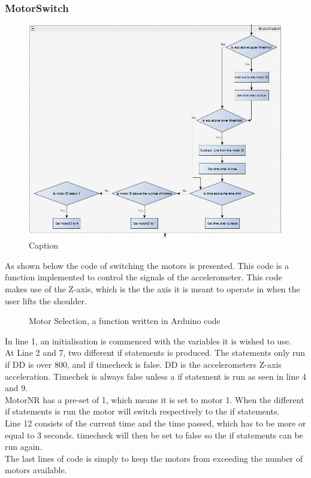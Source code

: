 \subsubsection{ MotorSwitch }
\begin{figure}[H]
    \centering
    \includegraphics[width=\textwidth]{Figures/Technical_figures/Motor_select_flow.JPG}
    \caption{Caption}
    \label{fig:my_label}
\end{figure}
As shown below the code of switching the motors is presented. This code is a function implemented to control the signals of the accelerometer. This code makes use of the Z-axis, which is the the axis it is meant to operate in when the user lifts the shoulder.\\

\begin{figure}[H]
    \centering

    \caption{Motor Selection, a function written in Arduino code}
    \label{fig:motorSel}
\end{figure}

In line 1, an initialisation is commenced with the variables it is wished to use.\\
At Line 2 and 7, two different if statements is produced. The statements only run if DD is over 800, and if timecheck is false. DD is the accelerometers Z-axis acceleration. Timechek is always false unless a if statement is run as seen in line 4 and 9.\\
MotorNR has a pre-set of 1, which means it is set to motor 1. When the different if statements is run the motor will switch respectively to the if statements.\\
Line 12 consists of the current time and the time passed, which has to be more or equal to 3 seconds. timecheck will then be set to false so the if statements can be run again.\\
The last lines of code is simply to keep the motors from exceeding the number of motors available.

